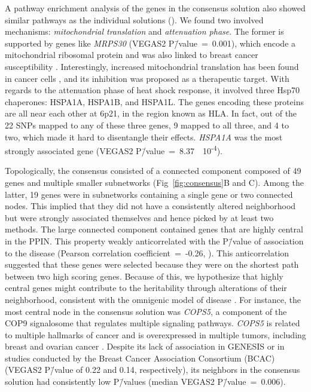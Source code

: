 \documentclass[10pt,letterpaper]{article}
\begin{document}
A pathway enrichment analysis of the genes in the consensus solution also showed similar pathways as the individual solutions (). We found two involved mechanisms: \emph{mitochondrial translation} and \emph{attenuation phase}. The former is supported by genes like \emph{MRPS30} (VEGAS2 P\=/value~=~0.001), which encode a mitochondrial ribosomal protein and was also linked to breast cancer susceptibility \cite{quigley_5p12_2014}. Interestingly, increased mitochondrial translation has been found in cancer cells \cite{Yu2016Repositioning}, and its inhibition was proposed as a therapeutic target. With regards to the attenuation phase of heat shock response, it involved three Hsp70 chaperones: HSPA1A, HSPA1B, and HSPA1L. The genes encoding these proteins are all near each other at 6p21, in the region known as HLA. In fact, out of the 22 SNPs mapped to any of these three genes, 9 mapped to all three, and 4 to two, which made it hard to disentangle their effects. \emph{HSPA1A} was the most strongly associated gene (VEGAS2 P\=/value~=~8.37~\texttimes{}~10\textsuperscript{-4}).  

Topologically, the consensus consisted of a connected component composed of 49 genes and multiple smaller subnetworks (Fig~\ref{fig:consensus}B and C). Among the latter, 19 genes were in subnetworks containing a single gene or two connected nodes. This implied that they did not have a consistently altered neighborhood but were strongly associated themselves and hence picked by at least two methods. The large connected component contained genes that are highly central in the PPIN. This property weakly anticorrelated with the P\=/value of association to the disease (Pearson correlation coefficient~=~-0.26, ). This anticorrelation suggested that these genes were selected because they were on the shortest path between two high scoring genes. Because of this, we hypothesize that highly central genes might contribute to the heritability through alterations of their neighborhood, consistent with the omnigenic model of disease \cite{boyle_expanded_2017}. For instance, the most central node in the consensus solution was \emph{COPS5}, a component of the COP9 signalosome that regulates multiple signaling pathways. \emph{COPS5} is related to multiple hallmarks of cancer and is overexpressed in multiple tumors, including breast and ovarian cancer \cite{liu_jab1_cops5_2018}. Despite its lack of association in GENESIS or in studies conducted by the Breast Cancer Association Consortium (BCAC) \cite{Michailidou2017} (VEGAS2 P\=/value of 0.22 and 0.14, respectively), its neighbors in the consensus solution had consistently low P\=/values (median VEGAS2 P\=/value~=~0.006).
\end{document}
